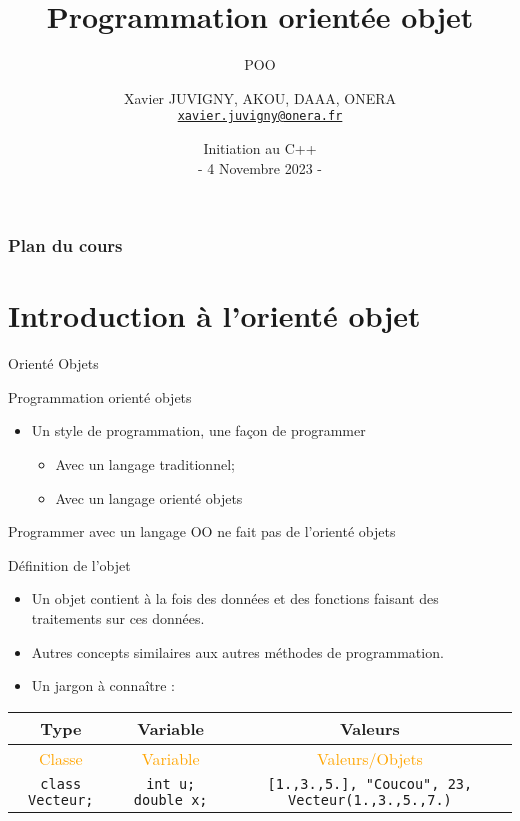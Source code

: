 \documentclass[compress,10pt,aspectratio=169]{beamer}
\title[Initiation C++\hspace{2em}]{Programmation orientée objet}
\subtitle{POO}
\author[X. JUVIGNY]{Xavier JUVIGNY, AKOU, DAAA, ONERA\\ \href{mailto:xavier.juvigny@onera.fr}{\texttt{xavier.juvigny@onera.fr}} }
\date[04/11/2023]{Initiation au C++ \\- 4 Novembre 2023 -}
\institute{\inst{1}ONERA,\inst{2}DAAA}
\begin{document}
\begin{frame}
 \titlepage
\end{frame}

\begin{frame}
\frametitle{Plan du cours}
\tableofcontents
\end{frame}

\section{Introduction à l'orienté objet}

\begin{frame}[fragile]{Orienté Objets}
    \scriptsize
    \begin{block}{Programmation orienté objets}
    \begin{itemize}
    \item Un style de programmation, une façon de programmer
    \begin{itemize}
    \scriptsize
    \item Avec un langage traditionnel;
    \item Avec un langage orienté objets
    \end{itemize}
    \end{itemize}
    \alert{Programmer avec un langage OO ne fait pas de l'orienté objets}
    \end{block}


    \begin{block}{Définition de l'objet}
    \begin{itemize}
    \item Un objet contient à la fois des données et des fonctions faisant des traitements sur ces données.
    \item Autres concepts similaires aux autres méthodes de programmation.
    \item Un jargon à connaître :
    \end{itemize}
    \begin{tabular}{|c|c|c|}\hline
    Type & Variable & Valeurs \\ \hline
    \textcolor{orange}{Classe} & \textcolor{orange}{Variable} & \textcolor{orange}{Valeurs/Objets} \\ \hline
    \texttt{class Vecteur;} & \texttt{int u; double x;} & \texttt{[1.,3.,5.], "Coucou",  23, Vecteur(1.,3.,5.,7.)} \\ \hline
    \end{tabular}
    \end{block}
    \end{frame}
   
\end{document}

